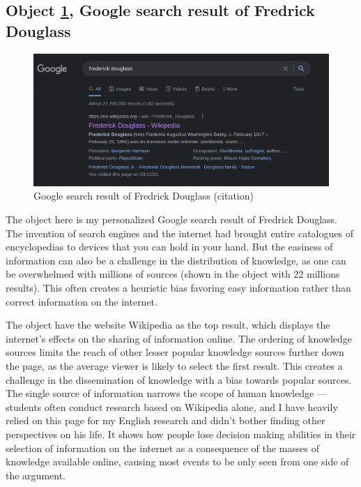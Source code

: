\documentclass[a4paper,11pt]{article}
\begin{document}


\subsection*{Object \ref{fig:download}, Google search result of Fredrick Douglass}

\begin{figure}[H]
 \centering
 \includegraphics[scale=0.25]{douglass.png}
 \caption{Google search result of Fredrick Douglass (citation)}
 \label{fig:download}
\end{figure}

The object here is my personalized Google search result of Fredrick Douglass. The invention of search engines and the internet had brought entire catalogues of encyclopedias to devices that you can hold in your hand. But the easiness of information can also be a challenge in the distribution of knowledge, as one can be overwhelmed with millions of sources (shown in the object with 22 millions results). This often creates a heuristic bias favoring easy information rather than correct information on the internet.

The object have the website Wikipedia as the top result, which displays the internet's effects on the sharing of information online. The ordering of knowledge sources limits the reach of other lesser popular knowledge sources further down the page, as the average viewer is likely to select the first result. This creates a challenge in the dissemination of knowledge with a bias towards popular sources. The single source of information narrows the scope of human knowledge --- students often conduct research based on Wikipedia alone, and I have heavily relied on this page for my English research and didn't bother finding other perspectives on his life. It shows how people lose decision making abilities in their selection of information on the internet as a consequence of the masses of knowledge available online, causing most events to be only seen from one side of the argument.
\end{document}
